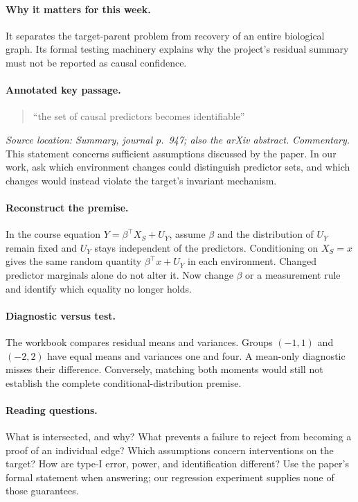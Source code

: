 \documentclass[11pt]{scrartcl}
\begin{document}
\paragraph{Why it matters for this week.} It separates the target-parent problem
from recovery of an entire biological graph. Its formal testing machinery explains
why the project's residual summary must not be reported as causal confidence.

\paragraph{Annotated key passage.}
\begin{quote}
``the set of causal predictors becomes identifiable''
\end{quote}
\emph{Source location: Summary, journal p.~947; also the arXiv abstract.}
\emph{Commentary.} This statement concerns sufficient assumptions discussed by the
paper. In our work, ask which environment changes could distinguish predictor sets,
and which changes would instead violate the target's invariant mechanism.

\paragraph{Reconstruct the premise.} In the course equation
$Y=\beta^\top X_S+U_Y$, assume $\beta$ and the distribution of $U_Y$ remain fixed
and $U_Y$ stays independent of the predictors. Conditioning on $X_S=x$ gives the
same random quantity $\beta^\top x+U_Y$ in each environment. Changed predictor
marginals alone do not alter it. Now change $\beta$ or a measurement rule and identify
which equality no longer holds.

\paragraph{Diagnostic versus test.} The workbook compares residual means and variances.
Groups $(-1,1)$ and $(-2,2)$ have equal means and variances one and four. A mean-only
diagnostic misses their difference. Conversely, matching both moments would still
not establish the complete conditional-distribution premise.

\paragraph{Reading questions.} What is intersected, and why? What prevents a failure
to reject from becoming a proof of an individual edge? Which assumptions concern
interventions on the target? How are type-I error, power, and identification different?
Use the paper's formal statement when answering; our regression experiment supplies
none of those guarantees.
\end{document}
